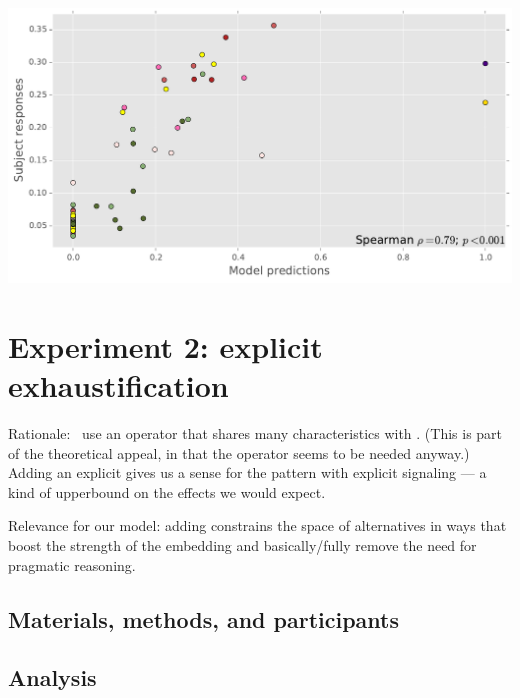 \documentclass{article}
\begin{document}
\begin{examples}
  \includegraphics[width=1\textwidth]{fig/experiment-scatterplot-speakernorm.pdf}
\end{examples}


\section{Experiment 2: explicit exhaustification}\label{sec:exp2}

\begin{examples}
\item Rationale: \CFS\ use an operator that shares many
  characteristics with . (This is part of the theoretical
  appeal, in that the operator seems to be needed anyway.)  Adding an
  explicit  gives us a sense for the pattern with explicit
  signaling --- a kind of upperbound on the effects we would expect.

\item Relevance for our model: adding  constrains the space
  of alternatives in ways that boost the strength of the embedding and
  basically/fully remove the need for pragmatic reasoning.  
\end{examples}


\subsection{Materials, methods, and participants}


\subsection{Analysis}
\end{document}
